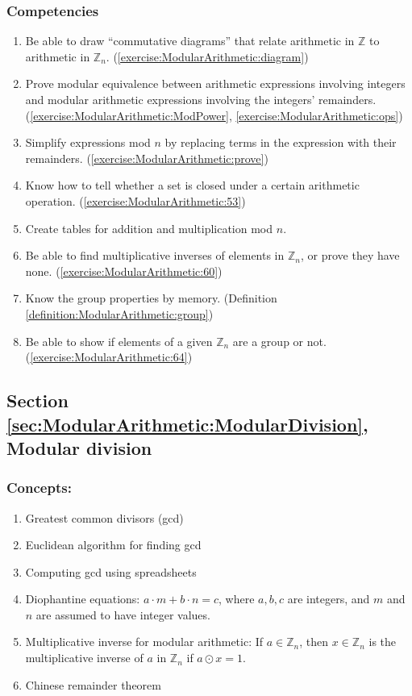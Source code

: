\subsubsection*{Competencies}
\begin{enumerate}
\item
Be able to draw ``commutative diagrams'' that relate arithmetic in ${\mathbb Z}$ to arithmetic in ${\mathbb Z}_{n}$. (\ref{exercise:ModularArithmetic:diagram}) 
\item
Prove modular equivalence between arithmetic expressions involving integers and modular arithmetic expressions involving the integers' remainders. (\ref{exercise:ModularArithmetic:ModPower}, \ref{exercise:ModularArithmetic:ops}) 
\item
Simplify expressions mod $n$ by replacing terms in the expression with their remainders. (\ref{exercise:ModularArithmetic:prove})
\item
Know how to tell whether a set is closed under a certain arithmetic operation. (\ref{exercise:ModularArithmetic:53})
\item
Create tables for addition and multiplication mod $n$.
\item
Be able to find multiplicative inverses of elements in ${\mathbb Z}_{n}$, or prove they have none. (\ref{exercise:ModularArithmetic:60})
\item
Know the group properties by memory. (Definition \ref{definition:ModularArithmetic:group})
\item
Be able to show if elements of a given ${\mathbb Z}_{n}$ are a group or not. (\ref{exercise:ModularArithmetic:64})
\end{enumerate}


\subsection*{Section \ref{sec:ModularArithmetic:ModularDivision}, Modular division}
\subsubsection*{Concepts:}
\begin{enumerate}
\item 
Greatest common divisors (gcd)
\item 
Euclidean algorithm for finding gcd
\item 
Computing gcd using spreadsheets
\item 
Diophantine equations: $a \cdot m + b \cdot n = c$, where $a, b, c$ are integers, and $m$ and $n$ are assumed to have integer values.
\item 
Multiplicative inverse for modular arithmetic: If $a \in \mathbb{Z}_n$, then $x \in  \mathbb{Z}_n$ is the multiplicative inverse of $a$ in $\mathbb{Z}_n$ if $a \odot x = 1$.
\item 
Chinese remainder theorem
\end{enumerate}

